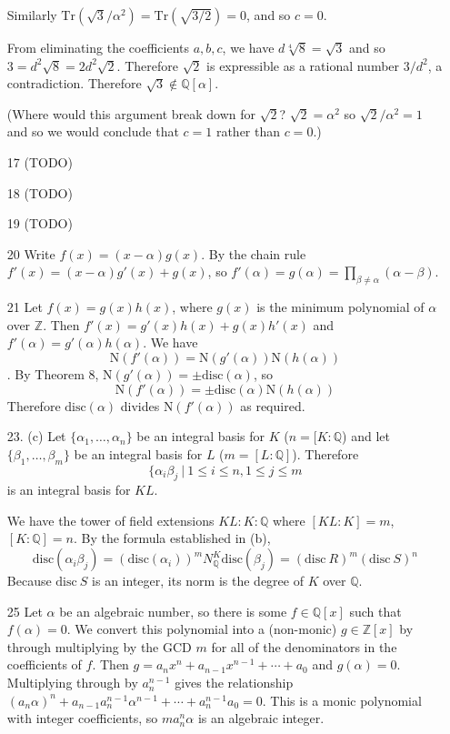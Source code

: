 \documentclass{article}
\newcommand{\Q}[0]{\mathbb{Q}}
\newcommand{\Z}[0]{\mathbb{Z}}
\newcommand{\qext}[1]{\mathbb{Q}[#1]}
\newcommand{\trace}[1]{\text{Tr}(#1)}
\newcommand{\norm}[1]{\text{N}(#1)}
\newcommand{\disc}[1]{\text{disc}(#1)}
\begin{document}
\begin{enumerate}
Similarly $\trace{\sqrt{3}/\alpha^2} = \trace{\sqrt{3/2}} = 0$, and so $c = 0$.

From eliminating the coefficients $a, b, c$, we have $d\sqrt[4]{8} = \sqrt{3}$ and so $3 = d^2\sqrt{8} = 2d^2\sqrt{2}$.  Therefore $\sqrt{2}$ is expressible as a rational number $3/d^2$, a contradiction.  Therefore $\sqrt{3} \not\in \qext{\alpha}$.

(Where would this argument break down for $\sqrt{2}$?  $\sqrt{2} = \alpha^2$ so $\sqrt{2} / \alpha^2 = 1$ and so we would conclude that $c = 1$ rather than $c = 0$.)

\item[17]{(TODO)}

\item[18]{(TODO)}

\item[19]{(TODO)}

\item[20] Write $f(x) = (x - \alpha)g(x)$.  By the chain rule $f'(x) = (x - \alpha)g'(x) + g(x)$, so $f'(\alpha) = g(\alpha) = \prod_{\beta \neq \alpha} (\alpha - \beta)$.

\item[21] Let $f(x) = g(x) h(x)$, where $g(x)$ is the minimum polynomial of $\alpha$ over $\mathbb{Z}$.  Then $f'(x) = g'(x)h(x) + g(x) h'(x)$ and $f'(\alpha) = g'(\alpha)h(\alpha)$.  We have \[ \norm{f'(\alpha)} = \norm{g'(\alpha)}\norm{h(\alpha)} \].  By Theorem 8, $\norm{g'(\alpha)} = \pm \disc{\alpha}$, so \[ \norm{f'(\alpha)} = \pm \disc{\alpha}\norm{h(\alpha)} \]
Therefore $\disc{\alpha}$ divides $\norm{f'(\alpha)}$ as required.

\item[23. (c)] Let $\{ \alpha_1, \ldots, \alpha_n \}$ be an integral basis for $K$ ($n = [K : \Q$) and let $\{ \beta_1, \ldots, \beta_m \}$ be an integral basis for $L$ ($m = [L : \Q]$).  Therefore \[ \{ \alpha_i \beta_j \ |\ 1 \le i \le n, 1 \le j \le m \] is an integral basis for $KL$.

We have the tower of field extensions $KL : K : \Q$ where $[KL : K] = m$, $[K : \Q] = n$.  By the formula established in (b), \[ \disc{\alpha_i \beta_j} = (\disc{\alpha_i})^m N^{K}_{\Q} \disc{\beta_j} = (\text{disc}\ R)^m (\text{disc}\ S)^n \]
Because $\text{disc}\ S$ is an integer, its norm is the degree of $K$ over $\Q$.

\item[25] Let $\alpha$ be an algebraic number, so there is some $f \in \Q[x]$ such that $f(\alpha) = 0$.  We convert this polynomial into a (non-monic) $g \in \Z[x]$ by through multiplying by the GCD $m$ for all of the denominators in the coefficients of $f$.  Then $g = a_n x^n + a_{n-1} x^{n-1} + \cdots + a_0$ and $g(\alpha) = 0$.  Multiplying through by $a_n ^ {n - 1}$ gives the relationship $(a_n \alpha)^n + a_{n-1} a_n^{n- 1} \alpha^{n - 1} + \cdots + a_n^{n-1} a_0 = 0$.  This is a monic polynomial with integer coefficients, so $m a_n^{n} \alpha$ is an algebraic integer.


\end{enumerate}
\end{document}
